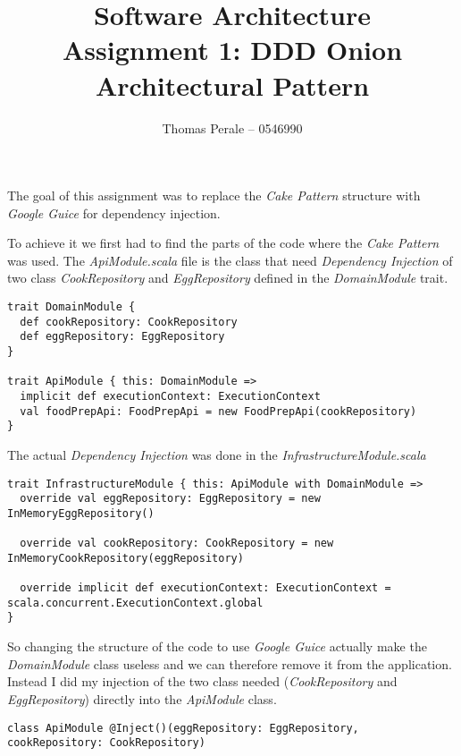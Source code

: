 \documentclass[a4paper,11pt]{article}
\begin{document}
\title{}
\title{Software Architecture\\Assignment 1: DDD Onion Architectural Pattern}
\author{Thomas Perale -- 0546990}

\maketitle

The goal of this assignment was to replace the \emph{Cake Pattern} structure
with \emph{Google Guice} for dependency injection.

To achieve it we first had to find the parts of the code where the \emph{Cake Pattern}
was used. The \emph{ApiModule.scala} file is the class that need \emph{Dependency Injection}
of two class \emph{CookRepository} and \emph{EggRepository} defined in the
\emph{DomainModule} trait.

\begin{lstlisting}[style=scala]
trait DomainModule {
  def cookRepository: CookRepository
  def eggRepository: EggRepository
}

trait ApiModule { this: DomainModule =>
  implicit def executionContext: ExecutionContext
  val foodPrepApi: FoodPrepApi = new FoodPrepApi(cookRepository)
}
\end{lstlisting}

The actual \emph{Dependency Injection} was done in the \emph{InfrastructureModule.scala}

\begin{lstlisting}[style=scala]
trait InfrastructureModule { this: ApiModule with DomainModule =>
  override val eggRepository: EggRepository = new InMemoryEggRepository()

  override val cookRepository: CookRepository = new InMemoryCookRepository(eggRepository)

  override implicit def executionContext: ExecutionContext = scala.concurrent.ExecutionContext.global
}
\end{lstlisting}

So changing the structure of the code to use \emph{Google Guice} actually make the
\emph{DomainModule} class useless and we can therefore remove it from the application.
Instead I did my injection of the two class needed (\emph{CookRepository} and
\emph{EggRepository}) directly into the \emph{ApiModule} class.

\begin{lstlisting}[style=scala]
class ApiModule @Inject()(eggRepository: EggRepository, cookRepository: CookRepository)
\end{lstlisting}
\end{document}
